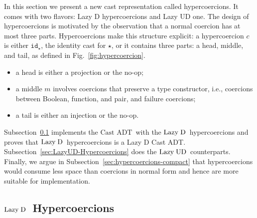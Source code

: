 \documentclass[runningheads]{llncs}
\newcommand{\figref}[1]{Fig.~\ref{#1}}
\newcommand{\LUD}{\ensuremath{\text{Lazy\;UD}}}
\newcommand{\LD}{\ensuremath{\text{Lazy\;D}}}
\newcommand{\CastADT}{\ensuremath{\text{Cast ADT}}}
\newcommand{\Tdyn}[0]{\ensuremath{\star}}
\newcommand{\cnfid}[1]{\ensuremath{\mathtt{id}_{#1}}}
\newcommand{\hcci}[0]{\cnfid{\Tdyn}}
\begin{document}
In this section we present a new cast representation called hypercoercions. It 
comes with two flavors: Lazy D hypercoercions and Lazy UD one.  The design of 
hypercoercions is motivated by the observation that a normal coercion has at most three
parts. Hypercoercions make this structure explicit: a hypercoercion $c$ is
either \hcci, the identity cast for \Tdyn, or it contains
three parts: a head, middle, and tail, as defined in
\figref{fig:hypercoercion}.
\begin{itemize}
	\item a head is either a projection or the no-op;
	\item a middle $m$ involves coercions that preserve a type
	constructor, i.e., coercions between Boolean, function, and pair, and 
	failure coercions;
	\item a tail is either an injection or the no-op.
\end{itemize}

Subsection~\ref{sec:LazyD-Hypercoercions} implements the \CastADT\ with the \LD\ 
hypercoercions and proves that \LD\ hypercoercions is a Lazy D Cast ADT. 
Subsection~\ref{sec:LazyUD-Hypercoercions} does the \LUD\ counterparts.
Finally, we argue in Subsection~\ref{sec:hypercoercions-compact} that 
hypercoercions would consume less space than coercions in 
normal form and hence are more suitable for implementation.

\subsection{\LD\ Hypercoercions}
\label{sec:LazyD-Hypercoercions}
\end{document}
